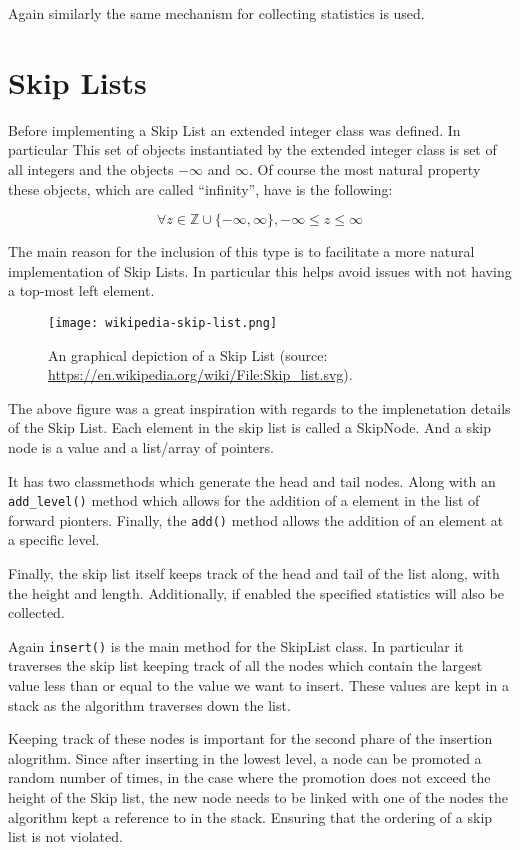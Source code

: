 \documentclass[article]{uom-coursework}
\begin{document}
Again similarly the same mechanism for collecting statistics is
used.

\section{Skip Lists}

Before implementing a Skip List an
extended integer class was defined. In particular
This set of objects instantiated by the extended
integer class is set of all integers and the
objects $-\infty$ and $\infty$. Of course
the most natural property these objects, which
are called ``infinity'', have is the
following:

$$\forall z \in \mathbb{Z} \cup \{-\infty, \infty\}, -\infty \leq z \leq \infty$$

The main reason for the inclusion of this type is to facilitate
a more natural implementation of Skip Lists. In particular this
helps avoid issues with not having a top-most left element.

\begin{figure}[H]
\centering
\texttt{[image: wikipedia-skip-list.png]}
\caption{An graphical depiction of a Skip List (source: \url{https://en.wikipedia.org/wiki/File:Skip_list.svg}).}
\label{fig:test9}
\end{figure}

The above figure was a great inspiration with regards
to the implenetation details of the Skip List.
Each element in the skip list is called a SkipNode.
And a skip node is a value and a list/array of pointers.

It has two classmethods which generate the head and tail nodes.
Along with an \texttt{add\_level()} method which allows for the
addition of a element in the list of forward pionters.
Finally, the \texttt{add()} method allows the addition
of an element at a specific level.

Finally, the skip list itself keeps track of the head and tail
of the list along, with the height and length. Additionally,
if enabled the specified statistics will also be collected.


Again \texttt{insert()} is the main method for the SkipList
class. In particular it traverses the skip list keeping
track of all the nodes which contain the largest
value less than or equal to the value we want to insert.
These values are kept in a stack as the algorithm traverses
down the list.

Keeping track of these nodes is important for the second phare
of the insertion alogrithm. Since after inserting in the lowest
level, a node can be promoted a random number of times, in the
case where the promotion does not exceed the height of the Skip
list, the new node needs to be linked with one of the nodes the
algorithm kept a reference to in the stack. Ensuring that the
ordering of a skip list is not violated. 
\end{document}
